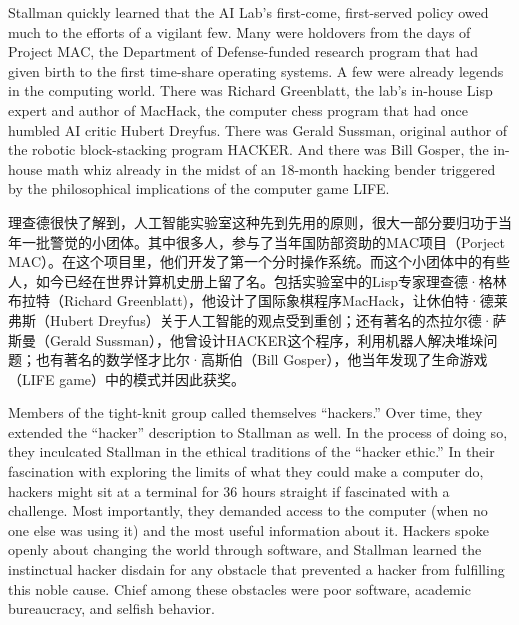 \ifdefined\eng
Stallman quickly learned that the AI Lab's first-come, first-served policy owed much to the efforts of a vigilant few. Many were holdovers from the days of Project MAC, the Department of Defense-funded research program that had given birth to the first time-share operating systems. A few were already legends in the computing world. There was Richard Greenblatt, the lab's in-house Lisp expert and author of MacHack, the computer chess program that had once humbled AI critic Hubert Dreyfus. There was Gerald Sussman, original author of the robotic block-stacking program HACKER. And there was Bill Gosper, the in-house math whiz already in the midst of an 18-month hacking bender triggered by the philosophical implications of the computer game LIFE.
\fi

\ifdefined\chs
理查德很快了解到，人工智能实验室这种先到先用的原则，很大一部分要归功于当年一批警觉的小团体。其中很多人，参与了当年国防部资助的MAC项目（Porject MAC）。在这个项目里，他们开发了第一个分时操作系统。而这个小团体中的有些人，如今已经在世界计算机史册上留了名。包括实验室中的Lisp专家理查德·格林布拉特（Richard Greenblatt)，他设计了国际象棋程序MacHack，让休伯特·德莱弗斯（Hubert Dreyfus）关于人工智能的观点受到重创；还有著名的杰拉尔德·萨斯曼（Gerald Sussman），他曾设计HACKER这个程序，利用机器人解决堆垛问题；也有著名的数学怪才比尔·高斯伯（Bill Gosper），他当年发现了生命游戏（LIFE game）中的模式并因此获奖。
\fi

\ifdefined\eng
Members of the tight-knit group called themselves ``hackers.'' Over time, they extended the ``hacker'' description to Stallman as well. In the process of doing so, they inculcated Stallman in the ethical traditions of the ``hacker ethic.'' In their fascination with exploring the limits of what they could make a computer do, hackers might sit at a terminal for 36 hours straight if fascinated with a challenge. Most importantly, they demanded access to the computer (when no one else was using it) and the most useful information about it. Hackers spoke openly about changing the world through software, and Stallman learned the instinctual hacker disdain for any obstacle that prevented a hacker from fulfilling this noble cause. Chief among these obstacles were poor software, academic bureaucracy, and selfish behavior.
\fi

